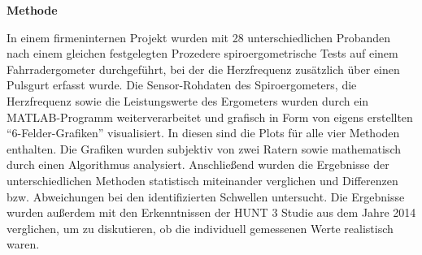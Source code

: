 \begin{center} \textbf{\Large Methode} \end{center}

In einem firmeninternen Projekt wurden mit 28 unterschiedlichen Probanden nach einem gleichen festgelegten Prozedere spiroergometrische Tests auf einem Fahrradergometer durchgeführt, bei der die Herzfrequenz zusätzlich über einen Pulsgurt erfasst wurde. Die Sensor-Rohdaten des Spiroergometers, die Herzfrequenz sowie die Leistungswerte des Ergometers wurden durch ein MATLAB-Programm weiterverarbeitet und grafisch in Form von eigens erstellten "`6-Felder-Grafiken"' visualisiert. In diesen sind die Plots für alle vier Methoden enthalten. Die Grafiken wurden subjektiv von zwei Ratern sowie mathematisch durch einen Algorithmus analysiert. Anschließend wurden die Ergebnisse der unterschiedlichen Methoden statistisch miteinander verglichen und Differenzen bzw. Abweichungen bei den identifizierten Schwellen untersucht. Die Ergebnisse wurden außerdem mit den Erkenntnissen der HUNT 3 Studie aus dem Jahre 2014 verglichen, um zu diskutieren, ob die individuell gemessenen Werte realistisch waren.
